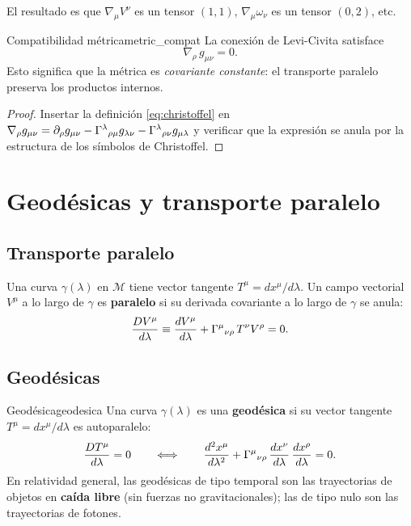 El resultado es que $\nabla_\mu V^\nu$ es un tensor $(1,1)$, $\nabla_\mu \omega_\nu$ es un tensor $(0,2)$, etc.

\begin{proposicion}{Compatibilidad métrica}{metric_compat}
La conexión de Levi-Civita satisface
\[
  \nabla_\rho\, g_{\mu\nu} = 0.
\]
Esto significa que la métrica es \emph{covariante constante}: el transporte paralelo preserva los productos internos.
\end{proposicion}

\begin{proof}
Insertar la definición \eqref{eq:christoffel} en $\nabla_\rho g_{\mu\nu} = \partial_\rho g_{\mu\nu} - \Gamma^{\lambda}{}_{\rho \mu} g_{\lambda\nu} - \Gamma^{\lambda}{}_{\rho \nu} g_{\mu\lambda}$ y verificar que la expresión se anula por la estructura de los símbolos de Christoffel.
\end{proof}

\section{Geodésicas y transporte paralelo}

\subsection{Transporte paralelo}

Una curva $\gamma(\lambda)$ en $\mathcal{M}$ tiene vector tangente $T^\mu = dx^\mu/d\lambda$. Un campo vectorial $V^\mu$ a lo largo de $\gamma$ es \textbf{paralelo} si su derivada covariante a lo largo de $\gamma$ se anula:
\begin{equation}
  \frac{DV^\mu}{d\lambda} \equiv \frac{dV^\mu}{d\lambda} + \Gamma^{\mu}{}_{\nu \rho}\, T^\nu V^\rho = 0.
  \label{eq:paralelo}
\end{equation}

\subsection{Geodésicas}

\begin{definicion}{Geodésica}{geodesica}
Una curva $\gamma(\lambda)$ es una \textbf{geodésica} si su vector tangente $T^\mu = dx^\mu/d\lambda$ es autoparalelo:
\begin{equation}
  \frac{DT^\mu}{d\lambda} = 0 \qquad \Longleftrightarrow \qquad
  \frac{d^2 x^\mu}{d\lambda^2} + \Gamma^{\mu}{}_{\nu \rho}\,\frac{dx^\nu}{d\lambda}\,\frac{dx^\rho}{d\lambda} = 0.
  \label{eq:geodesica}
\end{equation}
En relatividad general, las geodésicas de tipo temporal son las trayectorias de objetos en \textbf{caída libre} (sin fuerzas no gravitacionales); las de tipo nulo son las trayectorias de fotones.
\end{definicion}

